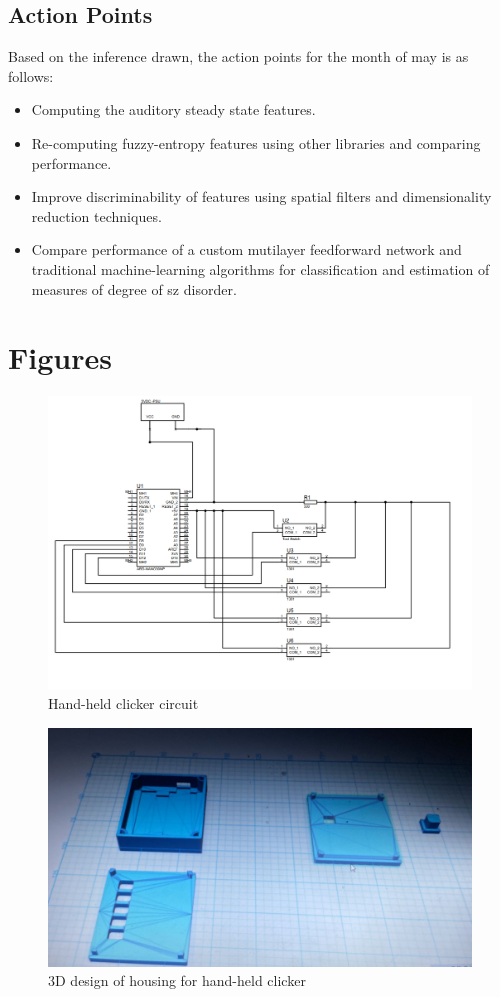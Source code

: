 \documentclass[10pt]{article}
\begin{document}
\subsection{Action Points}
Based on the inference drawn, the action points for the month of may is as follows:
\begin{itemize}
  \item Computing the auditory steady state features.
  \item Re-computing fuzzy-entropy features using other libraries and 
  comparing performance.
  \item Improve discriminability of features using spatial filters and dimensionality 
  reduction techniques.
  \item Compare performance of a custom mutilayer feedforward network and traditional 
  machine-learning algorithms for classification and estimation of measures of degree 
  of \gls{sz} disorder.
\end{itemize}

\section{Figures}\label{figures}
\begin{figure}[H]
  \includegraphics[width=16cm]{../../../hardware/handheld_clicker/circuit_image.png}
  \caption{Hand-held clicker circuit}\label{clicker_circuit}
\end{figure}
\begin{figure}[H]
  \includegraphics[width=16cm]{../../../hardware/handheld_clicker/3D_design_image.jpeg}
  \caption{3D design of housing for hand-held clicker}\label{clicker_3D}
\end{figure}
\end{document}
